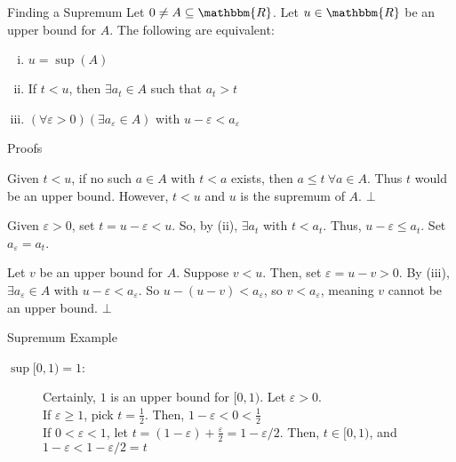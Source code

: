 \documentclass[10pt]{extarticle}
\newcommand{\R}{\mathbbm{R}}
\begin{document}
  \begin{problem}{Finding a Supremum}
    Let $0\neq A\subseteq \R$. Let $u\in\R$ be an upper bound for $A$. The following are equivalent:
    \begin{enumerate}[(i)]
      \item $u=\sup(A)$
      \item If $t<u$, then $\exists a_t\in A$ such that $a_t > t$
      \item $(\forall \varepsilon > 0)(\exists a_{\varepsilon}\in A)$ with $u-\varepsilon < a_{\varepsilon}$
    \end{enumerate}
    \begin{problem}{Proofs}
      \begin{description}[font=\normalfont]
        \item[(i) $\Rightarrow$ (ii):] Given $t < u$, if no such $a\in A$ with $t < a$ exists, then $a \leq t~\forall a\in A$. Thus $t$ would be an upper bound. However, $t < u$ and $u$ is the supremum of $A$. $\bot$
        \item[(ii) $\Rightarrow$ (iii):] Given $\varepsilon > 0$, set $t = u-\varepsilon < u$. So, by (ii), $\exists a_t$ with $t < a_t$. Thus, $u-\varepsilon \leq a_t$. Set $a_{\varepsilon} = a_t$.
        \item[(iii) $\Rightarrow$ (i):] Let $v$ be an upper bound for $A$. Suppose $v < u$. Then, set $\varepsilon = u-v > 0$. By (iii), $\exists a_{\varepsilon}\in A$ with $u-\varepsilon < a_{\varepsilon}$. So $u-(u-v) < a_{\varepsilon}$, so $v < a_{\varepsilon}$, meaning $v$ cannot be an upper bound. $\bot$
      \end{description}
    \end{problem}
  \end{problem}
  \begin{problem}{Supremum Example}
    \begin{description}
      \item[$\sup [0,1) = 1$:] Certainly, $1$ is an upper bound for $[0,1)$. Let $\varepsilon > 0$.\\

        If $\varepsilon \geq 1$, pick $t = \frac{1}{2}$. Then, $1-\varepsilon < 0 < \frac{1}{2}$\\

        If $0 < \varepsilon < 1$, let $t = (1-\varepsilon) + \frac{\varepsilon}{2} = 1-\varepsilon/2$. Then, $t\in [0,1)$, and $1-\varepsilon < 1-\varepsilon/2 = t$
    \end{description}
  \end{problem}
\end{document}
